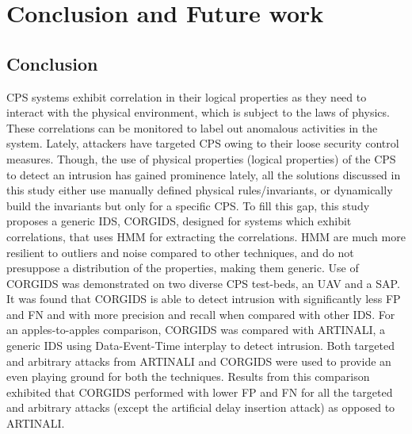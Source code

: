 
\chapter{\textbf{Conclusion and Future work}}
\label{sec8:Conclusion}

\section{Conclusion}
\acf{CPS} systems exhibit correlation in their logical properties as they need to interact with the physical environment, which is subject to the laws of physics. These correlations can be monitored to label out anomalous activities in the system. Lately, attackers have targeted \ac{CPS} owing to their loose security control measures. Though, the use of physical properties (logical properties) of the \ac{CPS} to detect an intrusion has gained prominence lately, all the solutions discussed in this study either use manually defined physical rules/invariants, or dynamically build the invariants but only for a specific \ac{CPS}. To fill this gap, this study proposes a generic \ac{IDS}, \ac{CORGIDS}, designed for systems which exhibit correlations, that uses \acf{HMM} for extracting the correlations. \ac{HMM} are much more resilient to outliers and noise compared to other techniques, and do not presuppose a distribution of the properties, making them generic.
Use of \ac{CORGIDS} was demonstrated on two diverse \ac{CPS} test-beds, an \ac{UAV} and a \ac{SAP}. It was found that \ac{CORGIDS} is able to detect intrusion with significantly less \acf{FP} and \acf{FN} and with more precision and recall when compared with other \ac{IDS}. For an apples-to-apples comparison, \ac{CORGIDS} was compared with ARTINALI, a generic \ac{IDS} using Data-Event-Time interplay to detect intrusion. Both targeted and arbitrary attacks from ARTINALI and \ac{CORGIDS} were used to provide an even playing ground for both the techniques. Results from this comparison exhibited that \ac{CORGIDS} performed with lower \ac{FP} and \ac{FN} for all the targeted and arbitrary attacks (except the artificial delay insertion attack) as opposed to ARTINALI.

